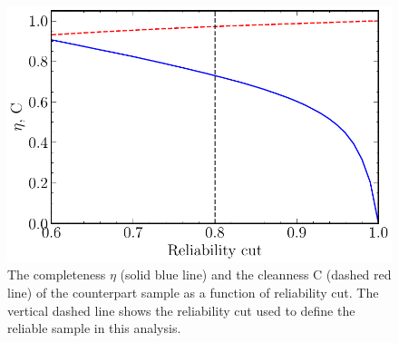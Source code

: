 \documentclass[fleqn,usenatbib]{mnras}
\begin{document}
\begin{figure}
	\includegraphics[width=\columnwidth]{Fig_5}
	\caption{The completeness $\eta$ (solid blue line) and the cleanness C (dashed red line) of the counterpart sample as a function of reliability cut. The vertical dashed line shows the reliability cut used to define the reliable sample in this analysis.} 
	\label{fig:completeness_cleanness}
\end{figure}
\end{document}
